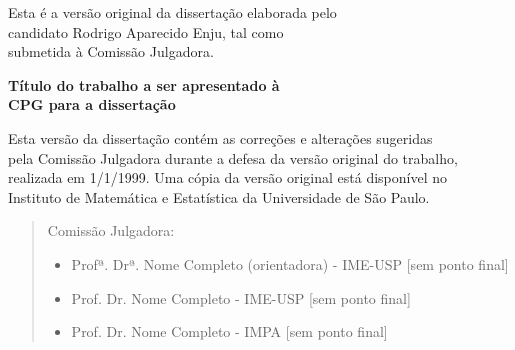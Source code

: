 \documentclass[11pt,twoside,a4paper]{book}
\newcommand{\datadefesa}{1/1/1999}
\newcommand{\formattedtitle}{Título do trabalho a ser apresentado à \\
    CPG para a dissertação}
\begin{document}
    \vskip 2cm

    \begin{flushright}
	Esta é a versão original da dissertação elaborada pelo\\
	candidato Rodrigo Aparecido Enju, tal como \\
	submetida à Comissão Julgadora.
    \end{flushright}

\pagebreak

%
%
%
%

\else
\newpage
\thispagestyle{empty}
    \begin{center}
        \vspace*{2.3 cm}
        \textbf{\Large{\formattedtitle}}\\
        \vspace*{2 cm}
    \end{center}

    \vskip 2cm

    \begin{flushright}
	Esta versão da dissertação contém as correções e alterações sugeridas\\
	pela Comissão Julgadora durante a defesa da versão original do trabalho,\\
	realizada em \datadefesa. Uma cópia da versão original está disponível no\\
	Instituto de Matemática e Estatística da Universidade de São Paulo.

    \vskip 2cm

    \end{flushright}
    \vskip 4.2cm

    \begin{quote}
    \noindent Comissão Julgadora:
    
    \begin{itemize}
		\item Profª. Drª. Nome Completo (orientadora) - IME-USP [sem ponto final]
		\item Prof. Dr. Nome Completo - IME-USP [sem ponto final]
		\item Prof. Dr. Nome Completo - IMPA [sem ponto final]
    \end{itemize}
      
    \end{quote}
\pagebreak
\fi
\end{document}
